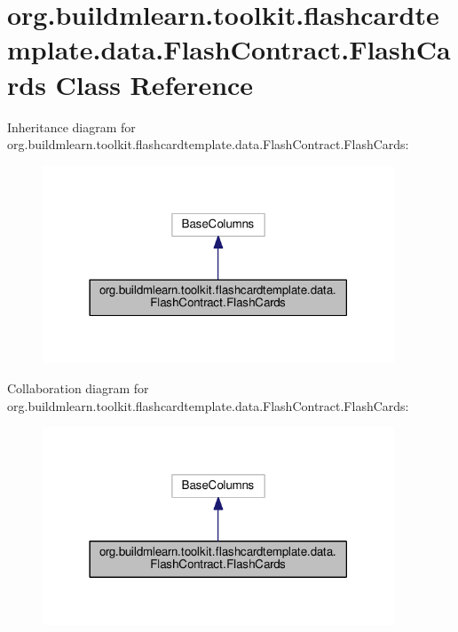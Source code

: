 \hypertarget{classorg_1_1buildmlearn_1_1toolkit_1_1flashcardtemplate_1_1data_1_1FlashContract_1_1FlashCards}{}\section{org.\+buildmlearn.\+toolkit.\+flashcardtemplate.\+data.\+Flash\+Contract.\+Flash\+Cards Class Reference}
\label{classorg_1_1buildmlearn_1_1toolkit_1_1flashcardtemplate_1_1data_1_1FlashContract_1_1FlashCards}


Inheritance diagram for org.\+buildmlearn.\+toolkit.\+flashcardtemplate.\+data.\+Flash\+Contract.\+Flash\+Cards\+:
\nopagebreak
\begin{figure}[H]
\begin{center}
\leavevmode
\includegraphics[width=297pt]{classorg_1_1buildmlearn_1_1toolkit_1_1flashcardtemplate_1_1data_1_1FlashContract_1_1FlashCards__inherit__graph}
\end{center}
\end{figure}


Collaboration diagram for org.\+buildmlearn.\+toolkit.\+flashcardtemplate.\+data.\+Flash\+Contract.\+Flash\+Cards\+:
\nopagebreak
\begin{figure}[H]
\begin{center}
\leavevmode
\includegraphics[width=297pt]{classorg_1_1buildmlearn_1_1toolkit_1_1flashcardtemplate_1_1data_1_1FlashContract_1_1FlashCards__coll__graph}
\end{center}
\end{figure}
